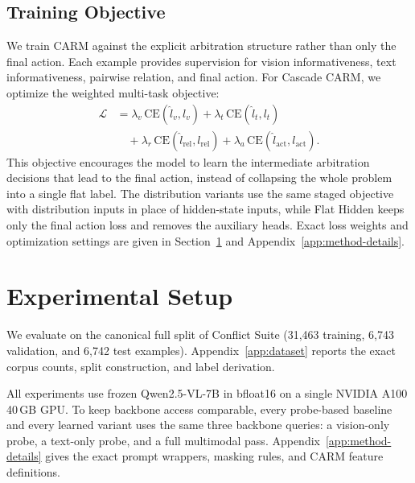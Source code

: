 \documentclass[11pt]{article}
\begin{document}
\subsection{Training Objective}
\label{sec:training-objective}

We train CARM against the explicit arbitration structure rather than only the final action.
Each example provides supervision for vision informativeness, text informativeness,
pairwise relation, and final action. For Cascade CARM, we optimize the weighted multi-task
objective:
\begin{align*}
\mathcal{L}
&= \lambda_v\,\mathrm{CE}(\hat{l}_v, l_v)
+ \lambda_t\,\mathrm{CE}(\hat{l}_t, l_t) \\
&\quad + \lambda_r\,\mathrm{CE}(\hat{l}_{\mathrm{rel}}, l_{\mathrm{rel}})
+ \lambda_a\,\mathrm{CE}(\hat{l}_{\mathrm{act}}, l_{\mathrm{act}}).
\end{align*}
This objective encourages the model to learn the intermediate arbitration decisions that
lead to the final action, instead of collapsing the whole problem into a single flat label.
The distribution variants use the same staged objective with distribution inputs in place of
hidden-state inputs, while Flat Hidden keeps only the final action loss and removes the
auxiliary heads. Exact loss weights and optimization settings are given in
Section~\ref{sec:experiments} and Appendix~\ref{app:method-details}.


\section{Experimental Setup}
\label{sec:experiments}

We evaluate on the canonical full split of Conflict Suite (31,463 training, 6,743
validation, and 6,742 test examples). Appendix~\ref{app:dataset} reports the exact corpus
counts, split construction, and label derivation.

All experiments use frozen Qwen2.5-VL-7B in bfloat16 on a single NVIDIA A100 40\,GB GPU.
To keep backbone access comparable, every probe-based baseline and every learned variant
uses the same three backbone queries: a vision-only probe, a text-only probe, and a full
multimodal pass. Appendix~\ref{app:method-details} gives the exact prompt wrappers,
masking rules, and CARM feature definitions.
\end{document}

